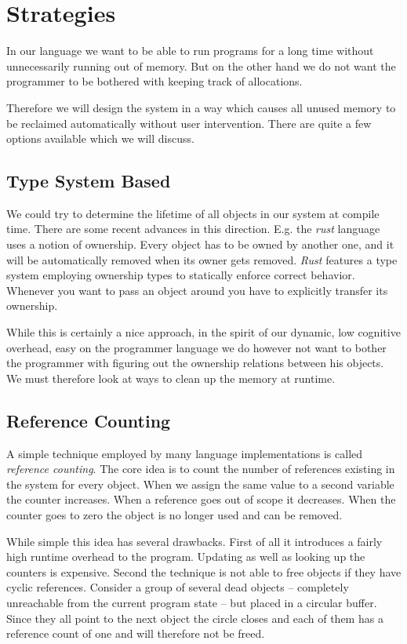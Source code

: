 \section{Strategies}

In our language we want to be able to run programs for a long time without unnecessarily running out of memory. But on the other hand we do not want the programmer to be bothered with keeping track of allocations.

Therefore we will design the system in a way which causes all unused memory to be reclaimed automatically without user intervention. There are quite a few options available which we will discuss.

\subsection{Type System Based}

We could try to determine the lifetime of all objects in our system at compile time. There are some recent advances in this direction. E.g. the \emph{rust} language uses a notion of ownership. Every object has to be owned by another one, and it will be automatically removed when its owner gets removed. \emph{Rust} features a type system employing ownership types to statically enforce correct behavior. Whenever you want to pass an object around you have to explicitly transfer its ownership.

While this is certainly a nice approach, in the spirit of our dynamic, low cognitive overhead, easy on the programmer language we do however not want to bother the programmer with figuring out the ownership relations between his objects. We must therefore look at ways to clean up the memory at runtime.

\subsection{Reference Counting}

A simple technique employed by many language implementations is called \emph{reference counting}. The core idea is to count the number of references existing in the system for every object. When we assign the same value to a second variable the counter increases. When a reference goes out of scope it decreases. When the counter goes to zero the object is no longer used and can be removed.

While simple this idea has several drawbacks. First of all it introduces a fairly high runtime overhead to the program. Updating as well as looking up the counters is expensive. Second the technique is not able to free objects if they have cyclic references. Consider a group of several dead objects -- completely unreachable from the current program state -- but \eg placed in a circular buffer. Since they all point to the next object the circle closes and each of them has a reference count of one and will therefore not be freed.

